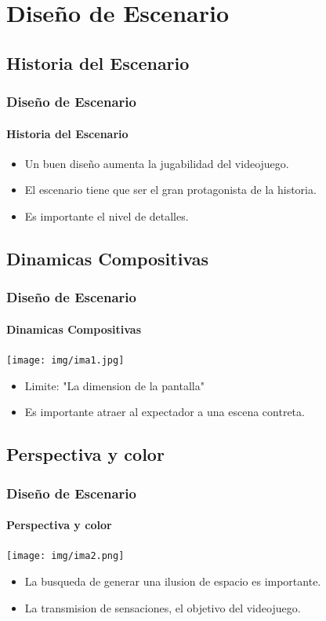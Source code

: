 \documentclass[11pt]{beamer}
\begin{document}
\section{Diseño de Escenario}
\subsection{Historia del Escenario}
\begin{frame}

\frametitle{Diseño de Escenario}
\framesubtitle{Historia del Escenario}
	\begin{itemize}
	\item Un buen diseño aumenta la jugabilidad del videojuego.
	\item El escenario tiene que ser el gran protagonista de la historia.
	\item Es importante el nivel de detalles.
	\end{itemize}
\end{frame}

\subsection{Dinamicas Compositivas}
\begin{frame}

\frametitle{Diseño de Escenario}
\framesubtitle{Dinamicas Compositivas}
\begin{center}


 \texttt{[image: img/ima1.jpg]}
\end{center}
	\begin{itemize}
	\item Limite: "La dimension de la pantalla"
	\item Es importante  atraer al expectador a una escena contreta.
	\end{itemize}
\end{frame}


\subsection{Perspectiva y color}
\begin{frame}

\frametitle{Diseño de Escenario}
\framesubtitle{Perspectiva y color}
\begin{center}


 \texttt{[image: img/ima2.png]}
\end{center}
	\begin{itemize}
	\item La busqueda de generar una ilusion de espacio es importante.
	\item La transmision de sensaciones, el objetivo del videojuego.
	\end{itemize}
\end{frame}
\end{document}
